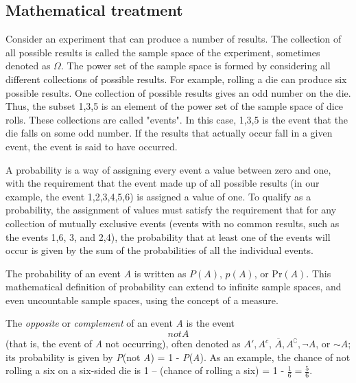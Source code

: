 \subsection{Mathematical treatment}
\label{sss:math-328f}




Consider an experiment that can produce a number of results. The collection of all
possible results is called the sample space of the experiment, sometimes denoted as
$\Omega$. The power set of the sample space is formed by considering all different
collections of possible results. For example, rolling a die can produce six possible
results. One collection of possible results gives an odd number on the die. Thus, the
subset {1,3,5} is an element of the power set of the sample space of dice rolls. These
collections are called "events". In this case, {1,3,5} is the event that the die falls on
some odd number. If the results that actually occur fall in a given event, the event is
said to have occurred.



A probability is a way of assigning every event a value between zero and one, with the
requirement that the event made up of all possible results (in our example, the event
{1,2,3,4,5,6}) is assigned a value of one. To qualify as a probability, the assignment of
values must satisfy the requirement that for any collection of mutually exclusive events
(events with no common results, such as the events {1,6}, {3}, and {2,4}), the probability
that at least one of the events will occur is given by the sum of the probabilities of all
the individual events.



The probability of an event \textit{A} is written as $P(A)$, $p(A)$, or $\text{Pr}(A)$.
This mathematical definition of probability can extend to infinite sample spaces, and even
uncountable sample spaces, using the concept of a measure.



The \textit{opposite} or \textit{complement} of an event \textit{A} is the event \[not
\textit{A}\] (that is, the event of \textit{A} not occurring), often denoted as $A', A^c$,
$\overline{A}, A^\complement, \neg A$, or ${\sim}A$; its probability is given by
\textit{P}(not \textit{A}) = 1 - \textit{P}(\textit{A}). As an example, the chance of not
rolling a six on a six-sided die is 1 -- (chance of rolling a six) = 1 - $\tfrac{1}{6} =
\tfrac{5}{6}$.



